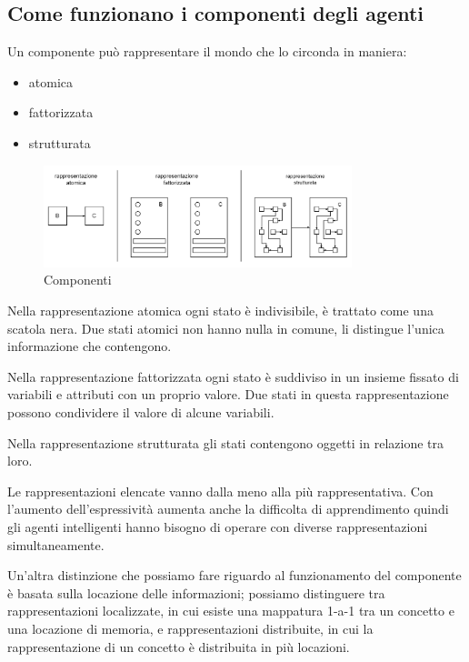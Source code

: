\subsection{Come funzionano i componenti degli agenti}

Un componente può rappresentare il mondo che lo circonda in maniera:

\begin{itemize}
	\item atomica
	\item fattorizzata
	\item strutturata
\end{itemize}

\begin{figure}[H]
	\centering
	\includegraphics[width=0.8\textwidth]{capitoli/agenti-intelligenti/imgs/componenti.png}
	\caption{Componenti}
	\label{fig:immagine7}
\end{figure}

Nella rappresentazione atomica ogni stato è indivisibile, è trattato come una scatola nera. Due stati atomici non hanno nulla in comune, li distingue l’unica informazione che contengono.

Nella rappresentazione fattorizzata ogni stato è suddiviso in un insieme fissato di variabili e attributi con un proprio valore. Due stati in questa rappresentazione possono condividere il valore di alcune variabili.

Nella rappresentazione strutturata gli stati contengono oggetti in relazione tra loro.

Le rappresentazioni elencate vanno dalla meno alla più rappresentativa. Con l’aumento dell’espressività aumenta anche la difficolta di apprendimento quindi gli agenti intelligenti hanno bisogno di operare con diverse rappresentazioni simultaneamente.

Un’altra distinzione che possiamo fare riguardo al funzionamento del componente è basata sulla locazione delle informazioni; possiamo distinguere tra rappresentazioni localizzate, in cui esiste una mappatura 1-a-1 tra un concetto e una locazione di memoria, e rappresentazioni distribuite, in cui la rappresentazione di un concetto è distribuita in più locazioni.